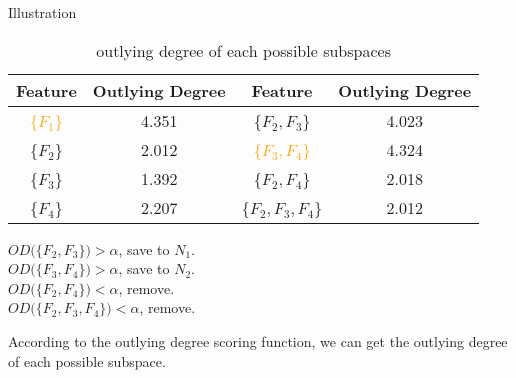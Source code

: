 \documentclass[
size=14pt,
paper=smartboard,  %
mode=present, 		%
display=slides, 	%
style=tuliplab,  	%
pauseslide,
fleqn,leqno]{powerdot}
\begin{document}
\begin{slide}[toc=,bm=]{Illustration}
	
	\setlength{\abovecaptionskip}{0pt}
	\setlength{\belowcaptionskip}{10pt}
	\centering
	\begin{table}
		\caption{outlying degree of each possible subspaces}
		
		\begin{tabular}{c|c|c|c}
			\toprule
			Feature & Outlying Degree & Feature & Outlying Degree \\
			\midrule
			\textcolor{orange}{\{$F_1$\}}  & 4.351  & \{$F_2, F_3$\}  & 4.023 \\
			\{$F_2$\}  & 2.012                      & \textcolor{orange}{\{$F_3, F_4$\}} & 4.324 \\
			\{$F_3$\}  & 1.392                      & \{$F_2, F_4$\} & 2.018 \\
			\{$F_4$\}  & 2.207                      & \{$F_2, F_3, F_4$\} & 2.012 \\
			\bottomrule
		\end{tabular}
	\end{table}
	
	\bigskip
	
	{
		\vspace{.75cm}
		$OD(\{$$F_2, F_3$$\}) > \alpha$, save to $N_1$. \\
		$OD(\{$$F_3, F_4$$\}) > \alpha$, save to $N_2$. \\
		$OD(\{$$F_2, F_4$$\}) < \alpha$, remove. \\
		$OD(\{$$F_2, F_3, F_4$$\}) < \alpha$, remove. \\
	}
	
	\begin{note}
		According to the outlying degree scoring function,
		we can get the outlying degree of each possible subspace.
		

\end{note}
\end{slide}
\end{document}
